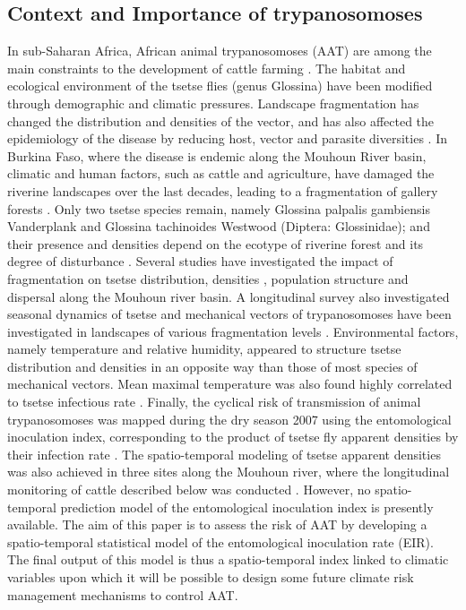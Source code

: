 \documentclass[10pt]{article}
\begin{document}
\subsection*{Context and Importance of trypanosomoses}
\label{unnumbered-3}
In sub-Saharan Africa, African animal trypanosomoses (AAT) are among the main constraints to the development of cattle farming \cite{itard2003trypanosomoses}.
The habitat and ecological environment of the tsetse flies (genus Glossina) have been modified through demographic and climatic pressures.
Landscape  fragmentation has changed the distribution and densities of the vector, and has also affected the epidemiology of the disease by reducing host, vector and parasite diversities \cite{van2010changing}. 
In Burkina Faso, where the disease is endemic along the Mouhoun River basin, climatic and human factors, such as cattle and agriculture, have damaged the riverine landscapes over the last decades,
leading to a fragmentation of gallery forests \cite{guerrini2008fragmentation}. Only two tsetse species remain, namely Glossina palpalis gambiensis Vanderplank and Glossina tachinoides Westwood (Diptera: Glossinidae); 
and their presence and densities depend on the ecotype of riverine forest and its degree of disturbance \cite{bouyer2005phyto}. Several studies have investigated the impact of fragmentation on tsetse distribution, densities \cite{bouyer2005phyto}, 
population structure and dispersal \cite{bouyer2007population, kone2010population} along the Mouhoun river basin. A longitudinal survey also investigated seasonal dynamics of tsetse and mechanical vectors of trypanosomoses have been investigated in landscapes of various fragmentation levels \cite{kone2010population}. 
Environmental factors, namely temperature and relative humidity, appeared to structure tsetse distribution and densities in an opposite way than those of most species of mechanical vectors. Mean maximal temperature was also found highly correlated to tsetse infectious rate \cite{bouyer2013dynamics}. 
Finally, the cyclical risk of transmission of animal trypanosomoses was mapped during the dry season 2007 using the entomological inoculation index, corresponding to the product of tsetse fly apparent densities by  their infection rate \cite{bouyer2006mapping, guerrini2007mapping}. 
The spatio-temporal modeling of tsetse apparent densities was also achieved in three sites along the Mouhoun river, where the longitudinal monitoring of cattle described below was conducted \cite{sedda2010spatio}. 
However, no spatio-temporal prediction model of the entomological inoculation index is presently available. 
The aim of this paper is to assess the risk of AAT  by developing a spatio-temporal statistical model of the entomological inoculation rate (EIR).  
The final output of this model is thus a spatio-temporal index linked to climatic variables upon which it will be possible to design some future climate risk management mechanisms to control AAT.
\end{document}
